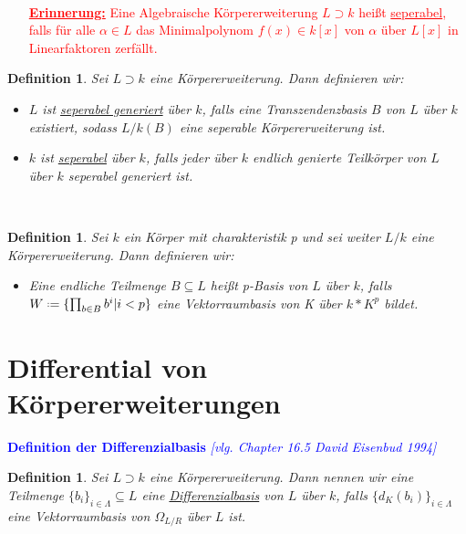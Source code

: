 \documentclass[10pt,a4paper]{report}
\newcommand{\comment}[1]{}
\newcommand{\ModulsOfDifferenzials}{David Eisenbud 1994}
\newcounter{Aussage}[chapter]
\newtheorem{definition}[Aussage]{Definition}
\newcommand{\divR}[2]{\Omega_{#1/#2}}
\newcommand{\divf}[1]{d_{#1}}
\newcommand*{\defeq}{\mathrel{\vcenter{\baselineskip0.5ex \lineskiplimit0pt
                     \hbox{\scriptsize.}\hbox{\scriptsize.}}}%
                     =}
\begin{document}
\ \\
\textcolor{red}{
\begin{itemize}
\item[\underline{\textbf{Erinnerung:}}] Eine Algebraische Körpererweiterung $L \supset k$ heißt \underline{seperabel}, falls für alle $\alpha \in L$ das Minimalpolynom $f(x) \in k[x]$ von $\alpha$ über $L[x]$ in Linearfaktoren zerfällt.
\end{itemize}
}
\begin{definition}\label{Definition Seperabel}
Sei $L \supset k$ eine Körpererweiterung. Dann definieren wir:
\begin{itemize}
\item $L$ ist \underline{seperabel generiert} über $k$, falls eine Transzendenzbasis $B$ von $L$ über $k$ existiert, sodass $L/k(B)$ eine seperable Körpererweiterung ist.
\item $k$ ist \underline{seperabel} über $k$, falls jeder über $k$ endlich genierte Teilkörper von $L$ über $k$ seperabel generiert ist.
\end{itemize}
\end{definition}


\ \\
\begin{definition}
Sei $k$ ein Körper mit charakteristik p und sei weiter $L/k$ eine Körpererweiterung. Dann definieren wir:
\begin{itemize}
\item Eine endliche Teilmenge $B \subseteq L$ heißt p-Basis von $L$ über $k$, falls $W \defeq \lbrace \prod_{b \in B} b^i \vert i < p \rbrace$ eine Vektorraumbasis von K über $k * K^p$ bildet.
\end{itemize}
\end{definition}

\section{Differential von Körpererweiterungen}

\textcolor{blue}{\textbf{Definition der Differenzialbasis} \textit{[vlg. Chapter 16.5 \ModulsOfDifferenzials]}}
\begin{definition}\comment{\label{Definition der Differenzialbasis}}
Sei $L \supset k$ eine Körpererweiterung. Dann nennen wir eine Teilmenge $\lbrace b_i \rbrace_{i \in \Lambda} \subseteq L$ eine \underline{Differenzialbasis} von $L$ über $k$, falls $\lbrace \divf{K}(b_i)\rbrace_{i \in \Lambda}$ eine Vektorraumbasis von $\divR{L}{R}$ über $L$ ist.
\end{definition}
\end{document}

